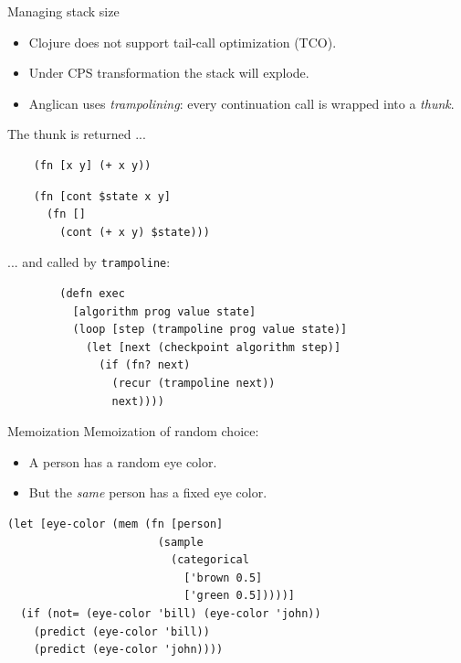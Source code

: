 \documentclass{beamer}
\begin{document}
\begin{frame}[fragile]{Managing stack size}
    \begin{itemize}
        \item Clojure does not support tail-call optimization (TCO).
        \item Under CPS transformation the stack will explode.
            \pause
        \item Anglican uses \textit{trampolining}: every continuation
            call is wrapped into a \textit{thunk}.
    \end{itemize}

    The thunk is returned ...

    \begin{minipage}{0.48\textwidth}
\begin{verbatim}
    (fn [x y] (+ x y))
\end{verbatim}
    \end{minipage}
    \begin{minipage}{0.48\textwidth}
        \vspace{0.5em}
\begin{verbatim}
    (fn [cont $state x y] 
      (fn []
        (cont (+ x y) $state)))
\end{verbatim}
      \vspace{0.5em}
    \end{minipage}
    \pause
    ... and  called by \texttt{trampoline}:

\begin{verbatim}
        (defn exec
          [algorithm prog value state]
          (loop [step (trampoline prog value state)]
            (let [next (checkpoint algorithm step)]
              (if (fn? next)
                (recur (trampoline next))
                next))))
\end{verbatim}

\end{frame}

\begin{frame}[fragile]{Memoization}
Memoization of random choice:
\begin{itemize}
    \item A person has a random eye color.
    \item But the \textit{same} person has a fixed eye color.
\end{itemize}
\begin{verbatim}
(let [eye-color (mem (fn [person] 
                       (sample 
                         (categorical
                           ['brown 0.5]
                           ['green 0.5]))))]
  (if (not= (eye-color 'bill) (eye-color 'john))
    (predict (eye-color 'bill))
    (predict (eye-color 'john))))
\end{verbatim}
\end{frame}
\end{document}

